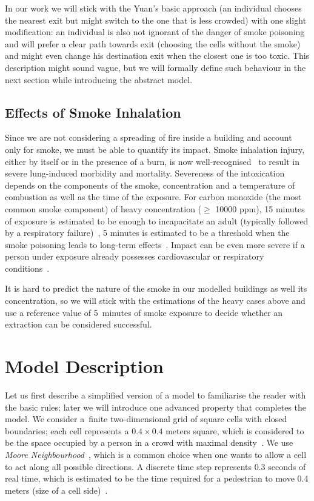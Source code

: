 In our work we will stick with the Yuan's basic approach (an individual chooses
the nearest exit but might switch to the one that is less crowded) with one
slight modification: an individual is also not ignorant of the danger
of smoke poisoning and will prefer a clear path towards exit (choosing the
cells without the smoke) and might even change his destination exit when the
closest one is too toxic.
This description might sound vague, but we will formally define such behaviour
in the next section while introducing the abstract model.

\subsection{Effects of Smoke Inhalation}
Since we are not considering a spreading of fire inside a building and account
only for smoke, we must be able to quantify its impact.
Smoke inhalation injury, either by itself or in the presence of a burn, is now
well-recognised~\cite{NCBI} to result in severe lung-induced morbidity and
mortality.
Severeness of the intoxication depends on the components of the smoke,
concentration and a temperature of combustion as well as the time of the
exposure.
For carbon monoxide (the most common smoke component) of heavy concentration
($\geq$ 10000 ppm), 15 minutes of exposure is estimated to be enough to
incapacitate an adult (typically followed by a respiratory
failure)~\cite{CO1, CO3}, 5 minutes is estimated to be a threshold when
the smoke poisoning leads to long-term effects~\cite{NCBI, CO2, CO3}.
Impact can be even more severe if a person under exposure already possesses
cardiovascular or respiratory conditions~\cite{NCBI, Inhalation}.

It is hard to predict the nature of the smoke in our modelled buildings as well
its concentration, so we will stick with the estimations of the heavy cases
above and use a reference value of 5~minutes of smoke exposure to decide
whether an extraction can be considered successful.

\section{Model Description}
Let us first describe a simplified version of a model to familiarise the reader
with the basic rules; later we will introduce one advanced property that
completes the model.
We consider a~finite two-dimensional grid of square cells with closed
boundaries; each cell represents a $0.4 \times 0.4$ meters square, which is
considered to be the space occupied by a person in a crowd with maximal
density~\cite{Density1, Density2}.
We use \emph{Moore Neighbourhood}~\cite{Moore}, which is a common choice when
one wants to allow a cell to act along all possible directions.
A discrete time step represents 0.3 seconds of real time, which is estimated to
be the time required for a pedestrian to move 0.4 meters (size of a cell
side)~\cite{Density1}.

